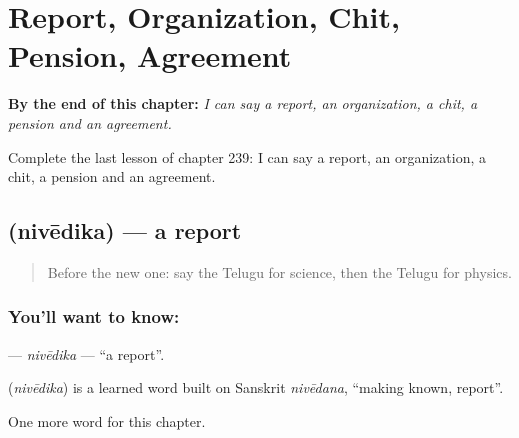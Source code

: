 
\chapter{Report, Organization, Chit, Pension, Agreement}
\label{ch:te-report-organization-chit-pension-agreement}

\begin{chapteropening}
\textbf{By the end of this chapter:} \emph{I can say a report, an organization, a chit, a pension and an agreement.}

Complete the last lesson of chapter 239: I can say a report, an organization, a chit, a pension and an agreement.
\end{chapteropening}

\section[\texorpdfstring{\te{నివేదిక} (nivēdika)}{నివేదిక (nivēdika)}]{ (nivēdika) — a report}

\label{lesson:TE-C239-nivedika}



\begin{quote}
Before the new one: say the Telugu for science, then the Telugu for physics.
\end{quote}

\subsection*{You'll want to know: }
\textbf{} — \emph{nivēdika} — \textquotedblleft{}a report\textquotedblright{}.

\begin{cousinweb}
\textbf{} (\emph{nivēdika}) is a learned word built on Sanskrit \emph{nivēdana}, \textquotedblleft{}making known, report\textquotedblright{}.
\end{cousinweb}

\begin{grammarlens}[title={What you've built}]
One more word for this chapter.
\end{grammarlens}

